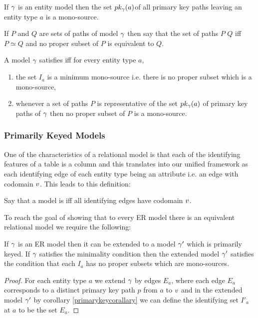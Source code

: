 \begin{corollary}
\label{primarykeycorallary}
If $\gamma$ is an entity model then the set $pk_{\gamma}(a)$of all primary key paths 
leaving an entity type $a$ is a mono-source.
\end{corollary}


\begin{definition}
If $P$ and $Q$ are sets of paths of model $\gamma$ then say that the set of paths $P$ 
 $Q$ 
iff $P \simeq Q$ and no proper subset of $P$ is equivalent to $Q$.
\end{definition}

\begin{definition}
A model $\gamma$ satisfies  iff for every entity type $a$,
\begin{enumerate}
\item the set $I_a$ is a minimum mono-source i.e. there is no proper subset which is a mono-source,
\item whenever a set of paths $P$ is representative of the set $pk_{\gamma}(a)$  of primary key paths of $\gamma$ then no proper subset of $P$ is a mono-source.
\end{enumerate}
\end{definition}

\subsubsection{Primarily Keyed Models}

One of the characteristics of a relational model is that each of the identifying features of a table is a column
and this translates into our unified framework as each identifying edge of each entity type being an attribute i.e. 
an edge with codomain $v$. This leads to this definition: 
\begin{definition}
Say that a model is  iff all identifying edges 
have codomain $v$.
\end{definition}
To reach the goal of showing that to every ER model there is an equivalent relational model we require the following:
\begin{lemma}
If $\gamma$ is an ER model then it can be extended to a model $\gamma'$
which is primarily keyed. If $\gamma$ satisfies the minimality condition then the
extended model $\gamma'$ satisfies the  condition that each $I_a$ has no proper subsets which
are mono-sources. 
\end{lemma}
\begin{proof}
For each entity type $a$ we extend $\gamma$ by edges $E_a$, where each edge 
$E_a$ corresponds to a distinct primary key path $p$ from $a$ to $v$
and in the extended model $\gamma'$ by corollary \ref{primarykeycorallary} 
we can define the identifying set $I'_a$ at $a$ to be the set
$E_a$. 
\end{proof}

